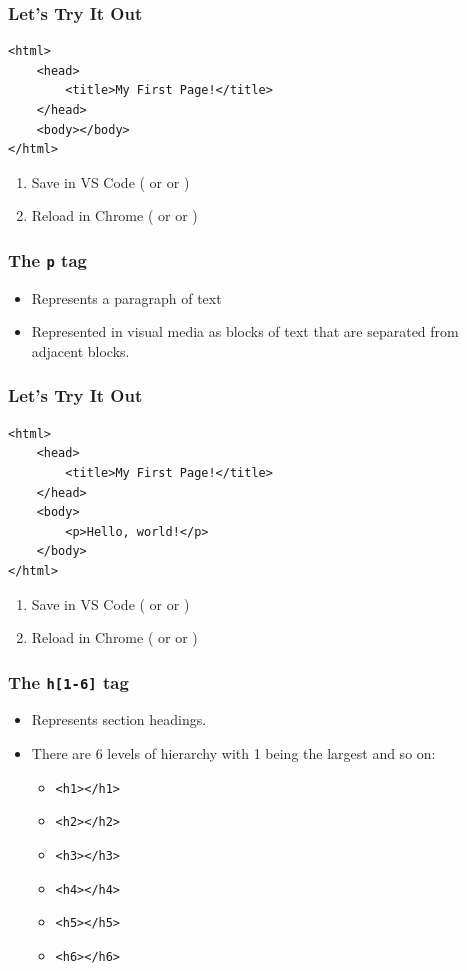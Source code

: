 \documentclass[12pt]{beamer}
\begin{document}
\begin{frame}[fragile]
\frametitle{Let's Try It Out}
\begin{verbatim}
<html>
	<head>
		<title>My First Page!</title>
	</head>
	<body></body>
</html>
\end{verbatim}
\begin{enumerate}
	\item Save in VS Code ( or  or )
	\item Reload in Chrome ( or  or )
\end{enumerate}
\end{frame}

\begin{frame}
\frametitle{The \texttt{p} tag}
\begin{itemize}
	\item Represents a paragraph of text \footnotemark
	\item Represented in visual media as blocks of text that are separated from adjacent blocks.
\end{itemize}
\end{frame}

\begin{frame}[fragile]
\frametitle{Let's Try It Out}
\begin{verbatim}
<html>
	<head>
		<title>My First Page!</title>
	</head>
	<body>
		<p>Hello, world!</p>
	</body>
</html>
\end{verbatim}
\begin{enumerate}
	\item Save in VS Code ( or  or )
	\item Reload in Chrome ( or  or )
\end{enumerate}
\end{frame}

\begin{frame}
\frametitle{The \texttt{h[1-6]} tag}
\begin{itemize}
	\item Represents section headings.\footnotemark
	\item There are 6 levels of hierarchy with 1 being the largest and so on:
	\begin{itemize}
		\item \texttt{<h1></h1>}
		\item \texttt{<h2></h2>}
		\item \texttt{<h3></h3>}
		\item \texttt{<h4></h4>}
		\item \texttt{<h5></h5>}
		\item \texttt{<h6></h6>}
	\end{itemize}
\end{itemize}
\end{frame}
\end{document}

